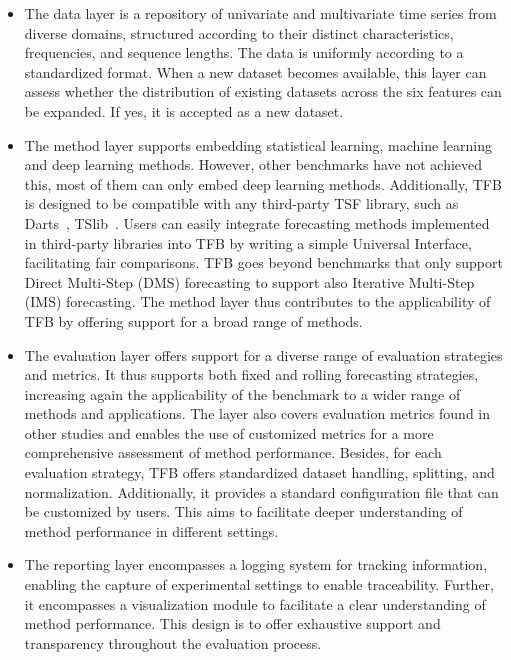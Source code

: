 \documentclass[sigconf, nonacm, pdfa]{acmart}
\begin{document}
\begin{itemize}[left=0.1cm]

\item The data layer is a repository of univariate and multivariate time series from diverse domains, structured according to their distinct characteristics, frequencies, and sequence lengths. The data is uniformly according to a standardized format. When a new dataset becomes available, this layer can assess whether the distribution of existing datasets across the six features can be expanded. If yes, it is accepted as a new dataset. 
\item The method layer supports embedding statistical learning, machine learning and deep learning methods. However, other benchmarks have not achieved this, most of them can only embed deep learning methods. Additionally, TFB is designed to be compatible with any third-party TSF library, such as Darts~\cite{herzen2022darts}, TSlib~\cite{wu2022timesnet}. Users can easily integrate forecasting methods implemented in third-party libraries into TFB by writing a simple Universal Interface, facilitating fair comparisons. TFB goes beyond benchmarks that only support Direct Multi-Step (DMS) forecasting to support also Iterative Multi-Step (IMS) forecasting. The method layer thus contributes to the applicability of TFB by offering support for a broad range of methods.



\item The evaluation layer offers support for a diverse range of evaluation strategies and metrics. It thus supports both fixed and rolling forecasting strategies, increasing again the applicability of the benchmark to a wider range of methods and applications. The layer also covers evaluation metrics found in other studies and enables the use of customized metrics for a more comprehensive assessment of method performance. Besides, for each evaluation strategy, TFB offers standardized dataset handling, splitting, and normalization. Additionally, it provides a standard configuration file that can be customized by users. This aims to facilitate deeper understanding of method performance in different settings.

\item The reporting layer encompasses a logging system for tracking information, enabling the capture of experimental settings to enable traceability. Further, it encompasses a visualization module to facilitate a clear understanding of method performance. This design is to offer exhaustive support and transparency throughout the evaluation process. 
\end{itemize}
\end{document}
